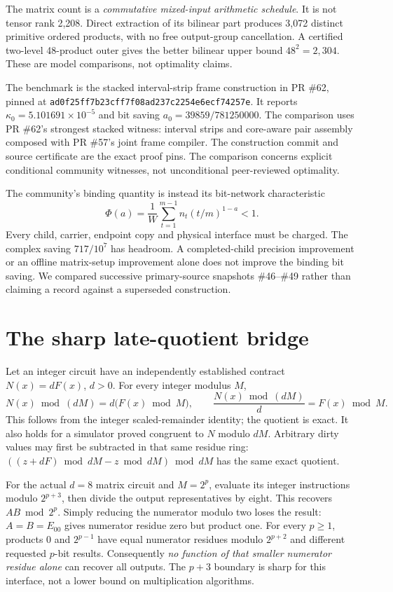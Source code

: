 \documentclass[11pt]{article}
\begin{document}
The matrix count is a \emph{commutative mixed-input arithmetic schedule}.
It is not tensor rank 2,208. Direct extraction of its bilinear part produces
3,072 distinct primitive ordered products, with no free output-group
cancellation. A certified two-level 48-product outer gives the better
bilinear upper bound $48^2=2,304$. These are model comparisons, not optimality
claims.

The benchmark is the stacked interval-strip frame construction in PR \#62, pinned at
\texttt{ad0f25ff7b23cff7f08ad237c2254e6ecf74257e}. It reports
$\kappa_0=5.101691\times10^{-5}$ and bit saving
$a_0=39859/781250000$. The comparison uses PR \#62's strongest stacked witness: interval strips and
core-aware pair assembly composed with PR \#57's joint frame compiler.
The construction commit and source certificate are the exact proof pins. The comparison concerns explicit conditional
community witnesses, not unconditional peer-reviewed optimality.

The community's binding quantity is instead its bit-network characteristic
\begin{equation}\label{eq:moment}
 \Phi(a)=\frac1W\sum_{t=1}^{m-1} n_t(t/m)^{1-a}<1.
\end{equation}
Every child, carrier, endpoint copy and physical interface must be charged.
The complex saving $717/10^7$ has headroom. A completed-child precision
improvement or an offline matrix-setup improvement alone does not improve
the binding bit saving. We compared successive primary-source snapshots
\#46--\#49 rather than claiming a record against a superseded construction.

\section{The sharp late-quotient bridge}
Let an integer circuit have an independently established contract
$N(x)=dF(x)$, $d>0$. For every integer modulus $M$,
\begin{equation}\label{eq:quotient}
 N(x)\bmod(dM)=d\bigl(F(x)\bmod M\bigr),\qquad
 \frac{N(x)\bmod(dM)}d=F(x)\bmod M.
\end{equation}
This follows from the integer scaled-remainder identity; the quotient is
exact. It also holds for a simulator proved congruent to $N$ modulo $dM$.
Arbitrary dirty values may first be subtracted in that same residue ring:
$((z+dF)\bmod dM-z\bmod dM)\bmod dM$ has the same exact quotient.

For the actual $d=8$ matrix circuit and $M=2^p$, evaluate its integer
instructions modulo $2^{p+3}$, then divide the output representatives by
eight. This recovers $AB\bmod2^p$. Simply reducing the numerator modulo two
loses the result: $A=B=E_{00}$ gives numerator residue zero but product one.
For every $p\ge1$, products $0$ and $2^{p-1}$ have equal numerator residues
modulo $2^{p+2}$ and different requested $p$-bit results. Consequently
\emph{no function of that smaller numerator residue alone} can recover all
outputs. The $p+3$ boundary is sharp for this interface, not a lower bound
on multiplication algorithms.
\end{document}
